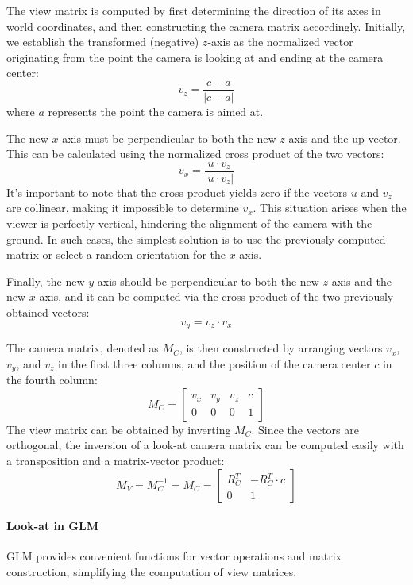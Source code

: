 The view matrix is computed by first determining the direction of its axes in world coordinates, and then constructing the camera matrix accordingly. 
Initially, we establish the transformed (negative) $z$-axis as the normalized vector originating from the point the camera is looking at and ending at the camera center:
\[v_z=\dfrac{c-a}{\left\lvert c-a \right\rvert }\]
where $a$ represents the point the camera is aimed at.

The new $x$-axis must be perpendicular to both the new $z$-axis and the up vector. 
This can be calculated using the normalized cross product of the two vectors:
\[v_x=\dfrac{u \cdot v_z}{\left\lvert u \cdot v_z \right\rvert }\]
It's important to note that the cross product yields zero if the vectors $u$ and $v_z$ are collinear, making it impossible to determine $v_x$. 
This situation arises when the viewer is perfectly vertical, hindering the alignment of the camera with the ground. 
In such cases, the simplest solution is to use the previously computed matrix or select a random orientation for the $x$-axis.

Finally, the new $y$-axis should be perpendicular to both the new $z$-axis and the new $x$-axis, and it can be computed via the cross product of the two previously obtained vectors:
\[v_y=v_z \cdot v_x\]

The camera matrix, denoted as $M_C$, is then constructed by arranging vectors $v_x$, $v_y$, and $v_z$ in the first three columns, and the position of the camera center $c$ in the fourth column:
\[M_C=\begin{bmatrix}
    v_x & v_y & v_z & c \\ 
    0 & 0 & 0 & 1
\end{bmatrix}\]
The view matrix can be obtained by inverting $M_C$.
Since the vectors are orthogonal, the inversion of a look-at camera matrix can be computed easily with a transposition and a matrix-vector product:
\[M_V=M_C^{-1}=M_C=\begin{bmatrix}
    R_C^T & -R_C^T\cdot c \\ 
    0 & 1
\end{bmatrix}\]

\paragraph*{Look-at in GLM}
GLM provides convenient functions for vector operations and matrix construction, simplifying the computation of view matrices.

